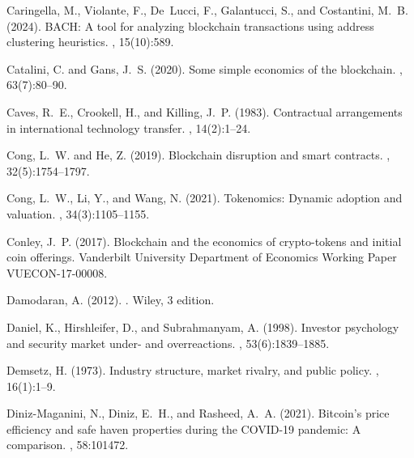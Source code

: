 \documentclass[12pt]{article}
\begin{document}
\begin{thebibliography}{}
Caringella, M., Violante, F., De~Lucci, F., Galantucci, S., and Costantini,
  M.~B. (2024).
\newblock BACH: A tool for analyzing blockchain transactions using address
  clustering heuristics.
, 15(10):589.

Catalini, C. and Gans, J.~S. (2020).
\newblock Some simple economics of the blockchain.
, 63(7):80--90.

Caves, R.~E., Crookell, H., and Killing, J.~P. (1983).
\newblock Contractual arrangements in international technology transfer.
, 14(2):1--24.

Cong, L.~W. and He, Z. (2019).
\newblock Blockchain disruption and smart contracts.
, 32(5):1754--1797.

Cong, L.~W., Li, Y., and Wang, N. (2021).
\newblock Tokenomics: Dynamic adoption and valuation.
, 34(3):1105--1155.

Conley, J.~P. (2017).
\newblock Blockchain and the economics of crypto-tokens and initial coin
  offerings.
\newblock Vanderbilt University Department of Economics Working Paper
  VUECON-17-00008.

Damodaran, A. (2012).
.
\newblock Wiley, 3 edition.

Daniel, K., Hirshleifer, D., and Subrahmanyam, A. (1998).
\newblock Investor psychology and security market under- and overreactions.
, 53(6):1839--1885.

Demsetz, H. (1973).
\newblock Industry structure, market rivalry, and public policy.
, 16(1):1--9.

Diniz-Maganini, N., Diniz, E.~H., and Rasheed, A.~A. (2021).
\newblock Bitcoin’s price efficiency and safe haven properties during the
  COVID-19 pandemic: A comparison.
, 58:101472.


\end{thebibliography}
\end{document}
